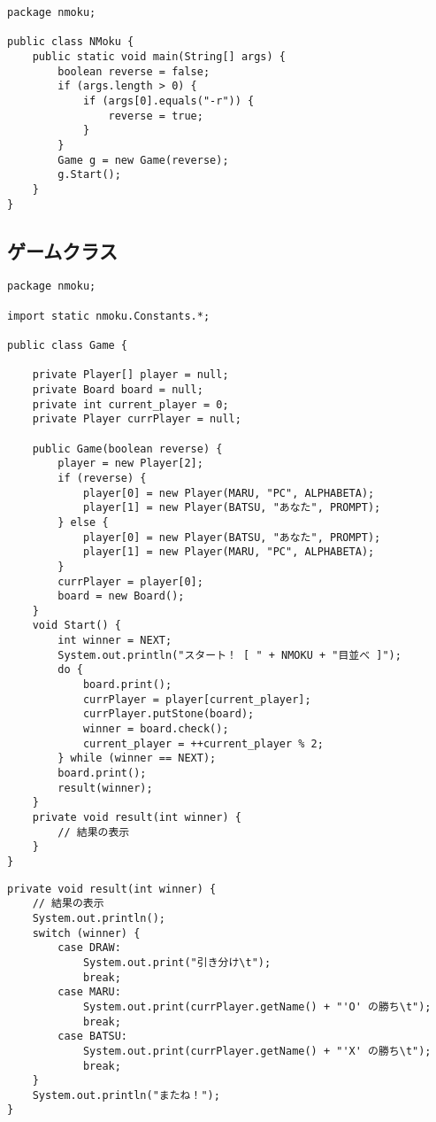 \documentclass[uplatex,a4paper,11pt,oneside,openany]{jsbook}
\begin{document}
\begin{lstlisting}[caption=主処理：N目並べ,label=prog23]
package nmoku;

public class NMoku {
    public static void main(String[] args) {
        boolean reverse = false;
        if (args.length > 0) {
            if (args[0].equals("-r")) {
                reverse = true;
            }
        }
        Game g = new Game(reverse);
        g.Start();
    }
}
\end{lstlisting}

\subsection{ゲームクラス}

\begin{lstlisting}[caption=ゲームクラス：N目並べ,label=prog24]
package nmoku;

import static nmoku.Constants.*;

public class Game {

    private Player[] player = null;
    private Board board = null;
    private int current_player = 0;
    private Player currPlayer = null;

    public Game(boolean reverse) {
        player = new Player[2];
        if (reverse) {
            player[0] = new Player(MARU, "PC", ALPHABETA);
            player[1] = new Player(BATSU, "あなた", PROMPT);
        } else {
            player[0] = new Player(BATSU, "あなた", PROMPT);
            player[1] = new Player(MARU, "PC", ALPHABETA);
        }
        currPlayer = player[0];
        board = new Board();
    }
    void Start() {
        int winner = NEXT;
        System.out.println("スタート！ [ " + NMOKU + "目並べ ]");
        do {
            board.print();
            currPlayer = player[current_player];
            currPlayer.putStone(board);
            winner = board.check();
            current_player = ++current_player % 2;
        } while (winner == NEXT);
        board.print();
        result(winner);
    }
    private void result(int winner) {
        // 結果の表示
    }
}
\end{lstlisting}

\begin{lstlisting}[caption=結果の表示：ゲームクラス内：N目並べ,label=prog25]
private void result(int winner) {
    // 結果の表示
    System.out.println();
    switch (winner) {
        case DRAW:
            System.out.print("引き分け\t");
            break;
        case MARU:
            System.out.print(currPlayer.getName() + "'O' の勝ち\t");
            break;
        case BATSU:
            System.out.print(currPlayer.getName() + "'X' の勝ち\t");
            break;
    }
    System.out.println("またね！");
}
\end{lstlisting}
\
\end{document}

